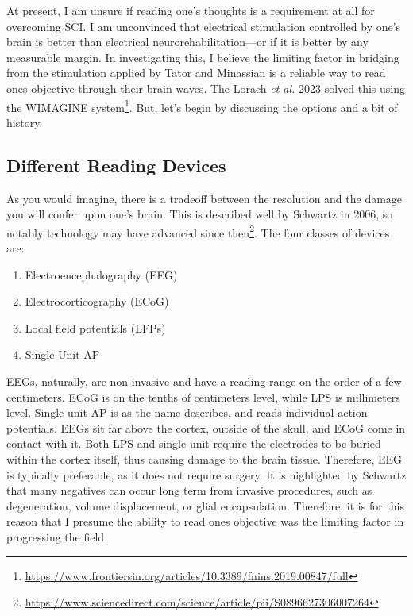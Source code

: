 At present, I am unsure if reading one's thoughts is a requirement at all for overcoming SCI. I am unconvinced that electrical stimulation controlled by one's brain is better than electrical neurorehabilitation---or if it is better by any measurable margin. In investigating this, I believe the limiting factor in bridging from the stimulation applied by Tator and Minassian is a reliable way to read ones objective through their brain waves. The Lorach \textit{et al.} 2023 solved this using the WIMAGINE system\footnote{\url{https://www.frontiersin.org/articles/10.3389/fnins.2019.00847/full}}. But, let's begin by discussing the options and a bit of history.

\subsection{Different Reading Devices} As you would imagine, there is a tradeoff between the resolution and the damage you will confer upon one's brain. This is described well by Schwartz in 2006, so notably technology may have advanced since then\footnote{\url{https://www.sciencedirect.com/science/article/pii/S0896627306007264}}. The four classes of devices are: 
\begin{enumerate}
    \itemsep 0em
    \item Electroencephalography (EEG)
    \item Electrocorticography (ECoG)
    \item Local field potentials (LFPs)
    \item Single Unit AP
\end{enumerate}

EEGs, naturally, are non-invasive and have a reading range on the order of a few centimeters. ECoG is on the tenths of centimeters level, while LPS is millimeters level. Single unit AP is as the name describes, and reads individual action potentials. EEGs sit far above the cortex, outside of the skull, and ECoG come in contact with it. Both LPS and single unit require the electrodes to be buried within the cortex itself, thus causing damage to the brain tissue. Therefore, EEG is typically preferable, as it does not require surgery. It is highlighted by Schwartz that many negatives can occur long term from invasive procedures, such as degeneration, volume displacement, or glial encapsulation. Therefore, it is for this reason that I presume the ability to read ones objective was the limiting factor in progressing the field. \newline

